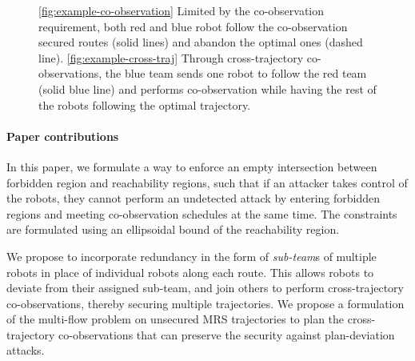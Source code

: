 \documentclass[journal]{IEEEtran}  %
\begin{document}
\begin{figure}
	\centering
    
    \caption{\ref{fig:example-co-observation} Limited by the co-observation requirement, both red and blue robot follow the co-observation secured routes (solid lines) and abandon the optimal ones (dashed line). \ref{fig:example-cross-traj} Through cross-trajectory co-observations, the blue team sends one robot to follow the red team (solid blue line) and performs co-observation while having the rest of the robots following the optimal trajectory.}\label{fig:cross-traj-comparison-set}
\end{figure}

\paragraph{Paper contributions} In this paper, we formulate a way to enforce an empty intersection between forbidden region and reachability regions, such that if an attacker takes control of the robots, they cannot perform an undetected attack by entering forbidden regions and meeting co-observation schedules at the same time. The constraints are formulated using an ellipsoidal bound of the reachability region. 

We propose to incorporate redundancy in the form of \emph{sub-team}s of multiple robots in place of individual robots along each route. This allows robots to deviate from their assigned sub-team, and join others to perform cross-trajectory co-observations, thereby securing multiple trajectories. We propose a formulation of the multi-flow problem on unsecured MRS trajectories to plan the cross-trajectory co-observations that can preserve the security against plan-deviation attacks.
\end{document}
